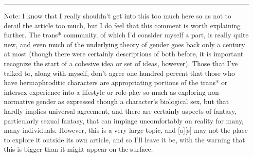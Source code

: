 \begin{center}\rule{0.5\linewidth}{\linethickness}\end{center}

Note: I know that I really shouldn't get into this too much here so as
not to derail the article too much, but I do feel that this comment is
worth explaining further. The trans* community, of which I'd consider
myself a part, is really quite new, and even much of the underlying
theory of gender goes back only a century at most (though there were
certainly descriptions of both before, it is important recognize the
start of a cohesive idea or set of ideas, however). Those that I've
talked to, along with myself, don't agree one hundred percent that those
who have hermaphroditic characters are appropriating portions of the
trans* or intersex experience into a lifestyle or role-play so much as
exploring non-normative gender as expressed though a character's
biological sex, but that hardly implies universal agreement, and there
are certainly aspects of fantasy, particularly sexual fantasy, that can
impinge uncomfortably on reality for many, many individuals. However,
this is a very large topic, and {[}a{]}{[}s{]} may not the place to
explore it outside its own article, and so I'll leave it be, with the
warning that this is bigger than it might appear on the surface.
